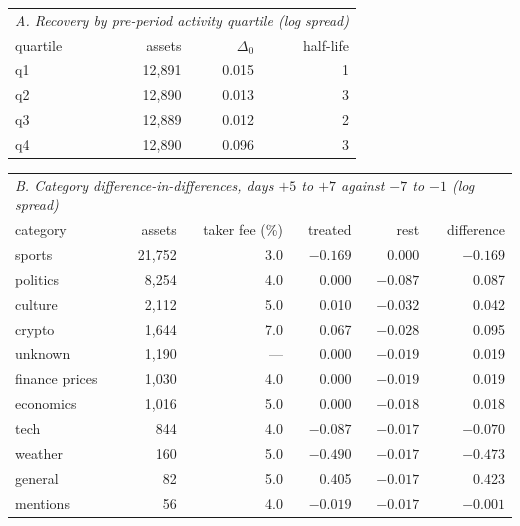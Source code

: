 \begin{table}[htbp]
\centering\footnotesize\setlength{\tabcolsep}{4pt}
\begin{tabular}{lrrr}
\toprule
\multicolumn{4}{l}{\emph{A. Recovery by pre-period activity quartile (log spread)}} \\
quartile & assets & $\Delta_0$ & half-life \\
\midrule
q1 & 12{,}891 & 0.015 & 1 \\
q2 & 12{,}890 & 0.013 & 3 \\
q3 & 12{,}889 & 0.012 & 2 \\
q4 & 12{,}890 & 0.096 & 3 \\
\bottomrule
\end{tabular}
\vspace{4pt}

\begin{tabular}{lrrrrr}
\toprule
\multicolumn{6}{l}{\emph{B. Category difference-in-differences, days $+5$ to $+7$ against $-7$ to $-1$ (log spread)}} \\
category & assets & taker fee (\%) & treated & rest & difference \\
\midrule
sports & 21{,}752 & 3.0 & $-0.169$ & 0.000 & $-0.169$ \\
politics & 8{,}254 & 4.0 & 0.000 & $-0.087$ & 0.087 \\
culture & 2{,}112 & 5.0 & 0.010 & $-0.032$ & 0.042 \\
crypto & 1{,}644 & 7.0 & 0.067 & $-0.028$ & 0.095 \\
unknown & 1{,}190 & --- & 0.000 & $-0.019$ & 0.019 \\
finance prices & 1{,}030 & 4.0 & 0.000 & $-0.019$ & 0.019 \\
economics & 1{,}016 & 5.0 & 0.000 & $-0.018$ & 0.018 \\
tech & 844 & 4.0 & $-0.087$ & $-0.017$ & $-0.070$ \\
weather & 160 & 5.0 & $-0.490$ & $-0.017$ & $-0.473$ \\
general & 82 & 5.0 & 0.405 & $-0.017$ & 0.423 \\
mentions & 56 & 4.0 & $-0.019$ & $-0.017$ & $-0.001$ \\
\bottomrule
\end{tabular}
\vspace{4pt}


\end{table}
